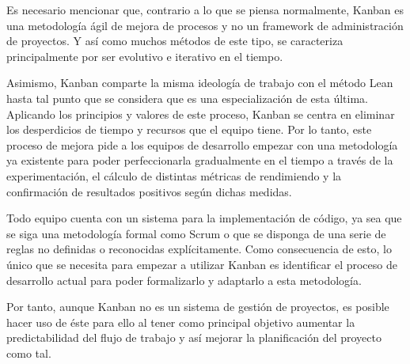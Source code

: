 Es necesario mencionar que, contrario a lo que se piensa normalmente, Kanban es
una metodología ágil de mejora de procesos y no un framework de administración
de proyectos. Y así como muchos métodos de este tipo, se caracteriza
principalmente por ser evolutivo e iterativo en el tiempo.

Asimismo, Kanban comparte la misma ideología de trabajo con el método Lean hasta
tal punto que se considera que es una especialización de esta última. Aplicando
los principios y valores de este proceso, Kanban se centra en eliminar los
desperdicios de tiempo y recursos que el equipo tiene. Por lo tanto, este
proceso de mejora pide a los equipos de desarrollo empezar con una metodología
ya existente para poder perfeccionarla gradualmente en el tiempo a través de la
experimentación, el cálculo de distintas métricas de rendimiendo y la
confirmación de resultados positivos según dichas medidas.

Todo equipo cuenta con un sistema para la implementación de código, ya sea que
se siga una metodología formal como Scrum o que se disponga de una serie de
reglas no definidas o reconocidas explícitamente. Como consecuencia de esto, lo
único que se necesita para empezar a utilizar Kanban es identificar el proceso
de desarrollo actual para poder formalizarlo y adaptarlo a esta metodología.

Por tanto, aunque Kanban no es un sistema de gestión de proyectos, es posible
hacer uso de éste para ello al tener como principal objetivo aumentar la
predictabilidad del flujo de trabajo y así mejorar la planificación del proyecto
como tal.

